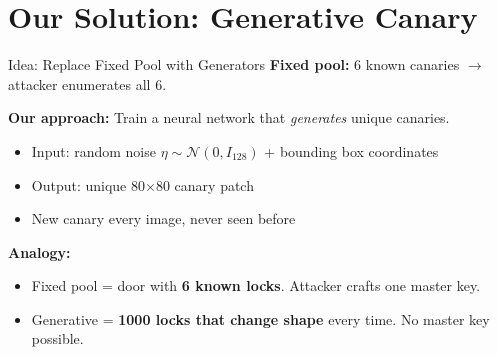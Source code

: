 \documentclass[aspectratio=169,11pt]{beamer}
\begin{document}
\section{Our Solution: Generative Canary}

\begin{frame}{Idea: Replace Fixed Pool with Generators}
\textbf{Fixed pool:} 6 known canaries $\to$ attacker enumerates all 6.

\vspace{0.3cm}
\textbf{Our approach:} Train a neural network that \textit{generates} unique canaries.
\begin{itemize}
    \item Input: random noise $\eta \sim \mathcal{N}(0, I_{128})$ + bounding box coordinates
    \item Output: unique 80$\times$80 canary patch
    \item New canary every image, never seen before
\end{itemize}

\vspace{0.3cm}
\textbf{Analogy:}
\begin{itemize}
    \item Fixed pool = door with \textbf{6 known locks}. Attacker crafts one master key.
    \item Generative = \textbf{1000 locks that change shape} every time. No master key possible.
\end{itemize}
\end{frame}
\end{document}
